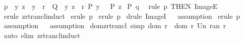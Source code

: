 \begin{isabellebody}
\ p{}{\isacharcolon}\ {\isachardoublequoteopen}{\isacharbang}{\isacharbang}\ y\ z{\isachardot}\ {\isacharbrackleft}{\isacharbar}\ y\ {\isacharcolon}\ {\isacharparenleft}r{\isacharpercent}{\isacharasterisk}{\isacharparenright}\ {\isacharparenleft}{\isacharbar}\ Q\ {\isacharbar}{\isacharparenright}{\isacharsemicolon}\ {\isacharparenleft}y{\isacharcomma}\ z{\isacharparenright}\ {\isacharcolon}\ r{\isacharsemicolon}\ P\ y\ {\isacharbar}{\isacharbrackright}\ {\isacharequal}{\isacharequal}{\isachargreater}\ P\ z{\isachardoublequoteclose}\isanewline
{}\ {\isachardoublequoteopen}P\ q\ {\isachardoublequoteclose}\isanewline
%
\isadelimproof
%
\endisadelimproof
%
\isatagproof
{}\isamarkupfalse%
\ {\isacharparenleft}rule\ p{}\ {\isacharbrackleft}THEN\ ImageE{\isacharbrackright}{\isacharparenright}\isanewline
{}\isamarkupfalse%
\ {\isacharparenleft}erule\ zrtrancl{\isacharunderscore}induct{\isacharparenright}\isanewline
{}\isamarkupfalse%
\ {\isacharparenleft}erule\ p{}{\isacharparenright}\isanewline
{}\isamarkupfalse%
\ {\isacharparenleft}erule\ p{}{\isacharparenright}\isanewline
{}\isamarkupfalse%
\ {\isacharparenleft}drule\ ImageI{\isacharparenright}\isanewline
\ \isamarkupfalse%
\ {\isacharparenleft}assumption{\isacharparenright}\isanewline
{}\isamarkupfalse%
\ {\isacharparenleft}erule\ p{}{\isacharparenright}\isanewline
\ \isamarkupfalse%
\ {\isacharparenleft}assumption{\isacharparenright}\isanewline
\ \isamarkupfalse%
\ {\isacharparenleft}assumption{\isacharparenright}\isanewline
{}\isamarkupfalse%
%
\endisatagproof
{\isafoldproof}%
%
\isadelimproof
\isanewline
%
\endisadelimproof
\isanewline
\isanewline
\isanewline
\isanewline
{}\isamarkupfalse%
\ dom{\isacharunderscore}zrtrancl\ {\isacharbrackleft}simp{\isacharbrackright}{\isacharcolon}\ {\isachardoublequoteopen}dom\ {\isacharparenleft}r{\isacharpercent}{\isacharasterisk}{\isacharparenright}\ {\isacharequal}\ {\isacharparenleft}dom\ r\ Un\ ran\ r{\isacharparenright}{\isachardoublequoteclose}\isanewline
%
\isadelimproof
%
\endisadelimproof
%
\isatagproof
{}\isamarkupfalse%
\ {\isacharparenleft}auto\ elim{\isacharcolon}\ zrtrancl{\isacharunderscore}induct{\isacharparenright}\isanewline
{}\isamarkupfalse%
%
\endisatagproof
{\isafoldproof}%
%
\isadelimproof
\isanewline
%
\endisadelimproof
\ \isanewline
{}\isamarkupfalse%

\end{isabellebody}
